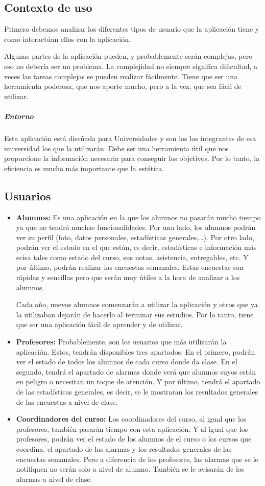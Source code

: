 \subsection{Contexto de uso}
Primero debemos analizar los diferentes tipos de usuario que la
aplicación tiene y como interactúan ellos con la aplicación.

Algunas partes de la aplicación pueden, y probablemente serán
complejas, pero eso no debería ser un problema. La complejidad no
siempre significa dificultad, a veces las tareas complejas se pueden
realizar fácilmente. Tiene que ser una herramienta poderosa, que nos
aporte mucho, pero a la vez, que sea fácil de utilizar.
\subparagraph{Entorno}
Esta aplicación está diseñada para Universidades y son los los
integrantes de esa universidad los que la utilizarán. Debe ser una
herramienta útil que nos proporcione la información necesaria para
conseguir los objetivos. Por lo tanto, la eficiencia es mucho más
importante que la estética.
\subsection{Usuarios}
\begin{itemize}
\item \textbf{Alumnos:} Es una aplicación en la que los alumnos no
  pasarán mucho tiempo ya que no tendrá muchas funcionalidades. Por
  una lado, los alumnos podrán ver su perfil (foto, datos personales,
  estadísticas generales,…). Por otro lado, podrán ver el estado en el
  que están, es decir, estadísticas e información más ecisa tales como
  estado del curso, sus notas, asistencia, entregables, etc.  Y por
  último, podrán realizar las encuestas semanales. Estas encuestas son
  rápidas y sencillas pero que serán muy útiles a la hora de analizar
  a los alumnos.

Cada año, nuevos alumnos comenzarán a utilizar la aplicación y otros
que ya la utilizaban dejarán de hacerlo al terminar sus estudios. Por
lo tanto, tiene que ser una aplicación fácil de aprender y de
utilizar.
\item \textbf{Profesores:} Probablemente, son los usuarios que más
  utilizarán la aplicación. Estos, tendrán disponibles tres
  apartados. En el primero, podrán ver el estado de todos los alumnos
  de cada curso donde da clase. En el segundo, tendrá el apartado de
  alarmas donde verá que alumnos suyos están en peligro o necesitan un
  toque de atención. Y por último, tendrá el apartado de las
  estadísticas generales, es decir, se le mostraran los resultados
  generales de las encuestas a nivel de clase.
\item \textbf{Coordinadores del curso:} Los coordinadores del curso,
  al igual que los profesores, también pasarán tiempo con esta
  aplicación. Y al igual que los profesores, podrán ver el estado de
  los alumnos de el curso o los cursos que coordina, el apartado de
  las alarmas y los resultados generales de las encuestas
  semanales. Pero a diferencia de los profesores, las alarmas que se
  le notifiquen no serán solo a nivel de alumno. También se le
  avisarán de los alarmas a nivel de clase.
\end{itemize}
